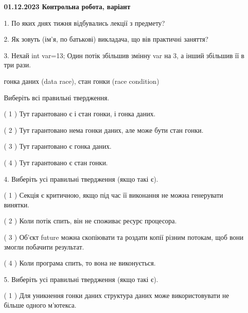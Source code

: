 \documentclass[12pt, ukrainian]{article}
\begin{document}
\vspace{4mm}
\newpage
\begin {large}

\textbf{01.12.2023 Контрольна робота, варіант  }\par


{
1. По яких днях тижня відбувались лекції з предмету?



\vspace{5mm}
2. Як зовуть (ім'я, по батькові) викладача, що вів практичні заняття?



\vspace{5mm}
3. Нехай int var=13; Один потік збільшив змінну var на 3, а інший збільшив її в три рази.

гонка даних (data race), стан гонки (race condition)

Виберіть всі правильні твердження.\par
\vspace{2mm}
( 1 ) Тут гарантовано є і стан гонки, і гонка даних.%

( 2 ) Тут гарантовано нема гонки даних, але може бути стан гонки.%

( 3 ) Тут гарантовано є гонка даних.%

( 4 ) Тут гарантовано є стан гонки.%


\vspace{5mm}
4. Виберіть усі правильні твердження (якщо такі є).\par
\vspace{2mm}

( 1 ) Секція є критичною, якщо під час її виконання не можна генерувати винятки.%

( 2 ) Коли потік спить, він не споживає ресурс процесора.%

( 3 ) Об’єкт future можна скопіювати та роздати копії різним потокам, щоб вони змогли побачити результат.%

( 4 ) Коли програма спить, то вона не виконується.%


\vspace{5mm}
5. Виберіть усі правильні твердження (якщо такі є).\par
\vspace{2mm}

( 1 ) Для уникнення гонки даних структура даних може використовувати не більше одного м’ютекса.%

}
\end{large}
\end{document}
